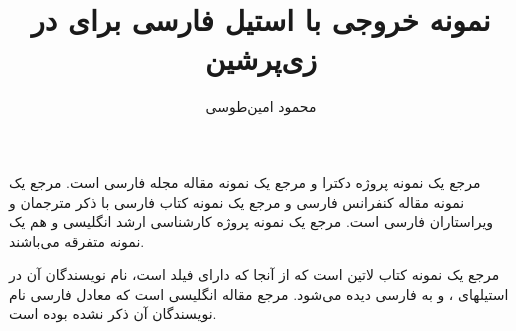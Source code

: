 \documentclass[11pt,a4paper]{article}
\title{نمونه خروجی با استیل فارسی \lr{acm-fa} برای \lr{BibTeX} در زی‌پرشین}
\author{محمود امین‌طوسی}\date{}
\begin{document}
\maketitle

مرجع \cite{Omidali82phdThesis} یک نمونه پروژه دکترا و مرجع \cite{Vahedi87} یک نمونه مقاله مجله فارسی است.
مرجع \cite{Amintoosi87afzayesh}  یک نمونه  مقاله کنفرانس فارسی و
مرجع \cite{Pedram80osool} یک نمونه کتاب فارسی با ذکر مترجمان و ویراستاران فارسی است. مرجع \cite{Khalighi07MscThesis} یک نمونه پروژه کارشناسی ارشد انگلیسی و
\cite{Khalighi87xepersian} هم یک نمونه متفرقه  می‌باشند.

مرجع \cite{Gonzalez02book} یک نمونه کتاب لاتین است که از آنجا که دارای فیلد  است، نام نویسندگان آن در استیلهای ،  و  به فارسی دیده می‌شود. مرجع \cite{Baker02limits} مقاله انگلیسی است که معادل فارسی نام نویسندگان آن ذکر نشده بوده است.


{\small



}
\end{document}
